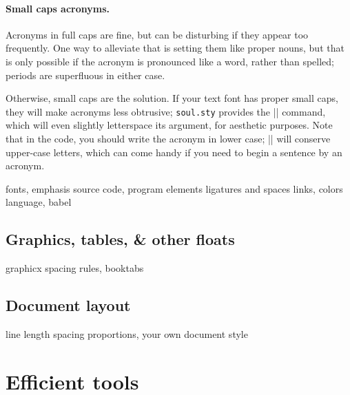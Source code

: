 \documentclass[a4paper,twoside,nofonts]{tufte-handout}
\newcommand\code[1]{\texttt{#1}}
\let\file\code
\newcommand\package[1]{\file{#1.sty}} %
\begin{document}
\paragraph{Small caps acronyms.}
Acronyms in full caps are fine, but can be disturbing if they appear too frequently.
One way to alleviate that is setting them like proper nouns, but that is only possible if the acronym is pronounced like a word, rather than spelled; periods are superfluous in either case.


Otherwise, small caps are the solution.
If your text font has proper small caps, they will make acronyms less obtrusive; \package{soul} provides the |\caps{}| command, which will even slightly letterspace its argument, for aesthetic purposes. 
Note that in the code, you should write the acronym in lower case; |\caps| will conserve upper-case letters, which can come handy if you need to begin a sentence by an acronym.

\begin{todoenv}
    fonts, emphasis
    source code, program elements
    ligatures and spaces
    links, colors
    language, babel
\end{todoenv}

\subsection{Graphics, tables, \& other floats} %
\label{sub:graphics}

\begin{todoenv}
    graphicx
    spacing
    rules, booktabs
\end{todoenv}

\subsection{Document layout} %
\label{sub:layout}

\begin{todoenv}
    line length
    spacing
    proportions, your own document style
\end{todoenv}



\clearpage
\section{Efficient tools} %
\label{sec:tools}
\end{document}
